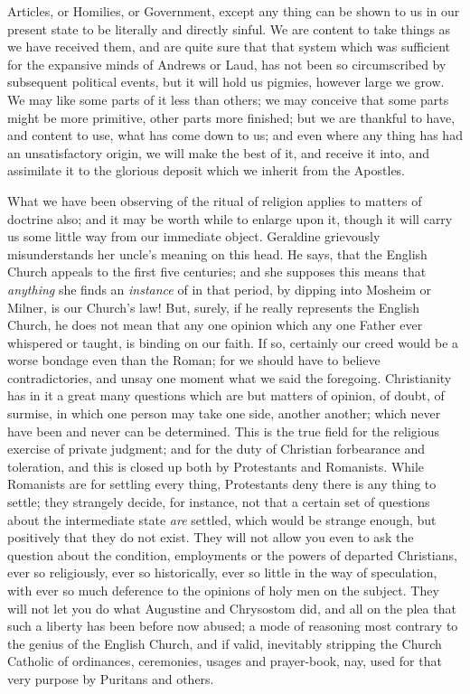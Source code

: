 Articles, or Homilies, or Government, except any thing can be shown to
us in our present state to be literally and directly sinful. We are
content to take things as we have received them, and are quite sure that
that system which was sufficient for the expansive minds of Andrews or
Laud, has not been so circumscribed by subsequent political events, but
it will hold us pigmies, however large we grow. We may like some parts
of it less than others; we may conceive that some parts might be more
primitive, other parts more finished; but we are thankful to have, and
content to use, what has come down to us; and even where any thing has
had an unsatisfactory origin, we will make the best of it, and receive
it into, and assimilate it to the glorious deposit which we inherit from
the Apostles.

What we have been observing of the ritual of
religion applies to matters of doctrine also; and it may be worth while
to enlarge upon it, though it will carry us some little way from our
immediate object. Geraldine grievously misunderstands her uncle's
meaning on this head. He says, that the English Church appeals to the
first five centuries; and she supposes this means that \emph{anything}
she finds an \emph{instance} of in that period, by dipping into Mosheim
or Milner, is our Church's law! But, surely, if he really represents the
English Church, he does not mean that any one opinion which any one
Father ever whispered or taught, is binding on our faith. If so,
certainly our creed would be a worse bondage even than the Roman; for we
should have to believe contradictories, and unsay one moment what we
said the foregoing. Christianity has in it a great many questions which
are but matters of opinion, of doubt, of surmise, in which one person
may take one side, another another; which never have been and never can
be determined. This is the true field for the religious exercise of
private judgment; and for the duty of Christian forbearance and
toleration, and this is closed up both by Protestants and Romanists.
While Romanists are for settling every thing, Protestants deny there is
any thing to settle; they strangely decide, for instance, not that a
certain set of questions about the intermediate state \emph{are}
settled, which would be strange enough, but positively that they do not
exist. They will not allow you even to ask the question about the
condition, employments or the powers of departed Christians, ever so
religiously, ever so historically, ever so little in the way of
speculation, with ever so much deference to the opinions of holy men on
the subject. They will not let you do what Augustine and Chrysostom did,
and all on the plea that such a liberty has been before now abused; a
mode of reasoning most contrary to the genius of the English
Church, and if valid, inevitably stripping the Church Catholic of
ordinances, ceremonies, usages and prayer-book, nay, used for that very
purpose by Puritans and others.

